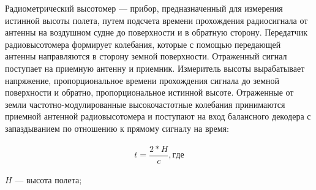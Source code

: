 \documentclass[pract, och, master]{SCWorks}
\begin{document}













Радиометрический высотомер --- прибор, предназначенный для измерения истинной высоты полета, путем подсчета времени прохождения радиосигнала от антенны на воздушном судне 
до поверхности и в обратную сторону. Передатчик радиовысотомера формирует колебания, которые с помощью передающей антенны направляются в сторону земной поверхности. 
Отраженный сигнал поступает на приемную антенну и приемник. Измеритель высоты вырабатывает напряжение, пропорциональное времени прохождения сигнала до земной 
поверхности и обратно, пропорциональное истинной высоте. Отраженные от земли частотно-модулированные высокочастотные колебания принимаются приемной антенной 
радиовысотомера и поступают на вход балансного декодера с запаздыванием по отношению к прямому сигналу на время:
 
\begin{align}
	t = \dfrac{2*H}{c}, где 
\end{align}

$H$ --- высота полета;
\end{document}
